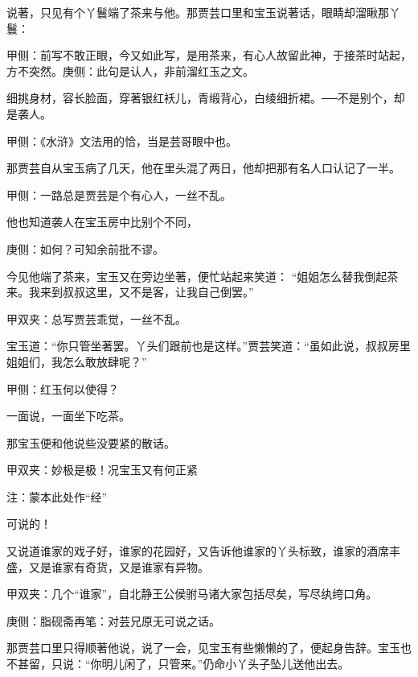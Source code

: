 \begin{parag}
    说著，只见有个丫鬟端了茶来与他。那贾芸口里和宝玉说著话，眼睛却溜瞅那丫鬟：\begin{note}甲侧：前写不敢正眼，今又如此写，是用茶来，有心人故留此神，于接茶时站起，方不突然。庚侧：此句是认人，非前溜红玉之文。\end{note}细挑身材，容长脸面，穿著银红袄儿，青缎背心，白绫细折裙。──不是别个，却是袭人。\begin{note}甲侧：《水浒》文法用的恰，当是芸哥眼中也。\end{note}那贾芸自从宝玉病了几天，他在里头混了两日，他却把那有名人口认记了一半。\begin{note}甲侧：一路总是贾芸是个有心人，一丝不乱。\end{note}他也知道袭人在宝玉房中比别个不同，\begin{note}庚侧：如何？可知余前批不谬。\end{note}今见他端了茶来，宝玉又在旁边坐著，便忙站起来笑道： “姐姐怎么替我倒起茶来。我来到叔叔这里，又不是客，让我自己倒罢。”\begin{note}甲双夹：总写贾芸乖觉，一丝不乱。\end{note}宝玉道：“你只管坐著罢。丫头们跟前也是这样。”贾芸笑道：“虽如此说，叔叔房里姐姐们，我怎么敢放肆呢？”\begin{note}甲侧：红玉何以使得？\end{note}一面说，一面坐下吃茶。
\end{parag}


\begin{parag}
    那宝玉便和他说些没要紧的散话。\begin{note}甲双夹：妙极是极！况宝玉又有何正紧\begin{subnote}注：蒙本此处作“经”\end{subnote}可说的！\end{note}又说道谁家的戏子好，谁家的花园好，又告诉他谁家的丫头标致，谁家的酒席丰盛，又是谁家有奇货，又是谁家有异物。\begin{note}甲双夹：几个“谁家”，自北静王公侯驸马诸大家包括尽矣，写尽纨绔口角。\end{note}\begin{note}庚侧：脂砚斋再笔：对芸兄原无可说之话。\end{note}那贾芸口里只得顺著他说，说了一会，见宝玉有些懒懒的了，便起身告辞。宝玉也不甚留，只说：“你明儿闲了，只管来。”仍命小丫头子坠儿送他出去。
\end{parag}


